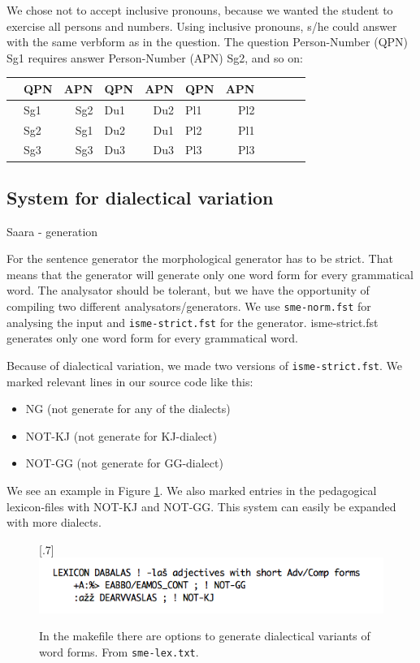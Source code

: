 \documentclass[a4paper,12pt]{article}
\begin{document}
We chose not to accept inclusive pronouns, because we wanted the student to exercise all persons and numbers. Using inclusive pronouns, s/he could answer with the same verbform as in the question. The question Person-Number (QPN) Sg1 requires answer Person-Number (APN) Sg2, and so on:\\


\begin{tabular}[t]{rlrlrlrlrlr}
&QPN &APN &QPN &APN &QPN &APN \\
\hline
&Sg1 &Sg2 &Du1 &Du2 &Pl1 &Pl2 \\
&Sg2 &Sg1 &Du2 &Du1 &Pl2 &Pl1 \\
&Sg3 &Sg3 &Du3 &Du3 &Pl3 &Pl3 \\
\end{tabular}


\subsection{System for dialectical variation}\label{dialect}
Saara - generation

For the sentence generator the morphological generator has to be strict. That means that the generator will generate only one word form for every grammatical word. The analysator should be tolerant, but we have the opportunity of compiling two different analysators/generators. We use \texttt{sme-norm.fst} for analysing the input and \texttt{isme-strict.fst} for the generator. isme-strict.fst generates only one word form for every grammatical word.

Because of dialectical variation, we made two versions of \texttt{isme-strict.fst}. We marked relevant lines in our source code like this:
\begin {itemize}
\item NG (not generate for any of the dialects)
\item NOT-KJ (not generate for KJ-dialect) 
\item NOT-GG (not generate for GG-dialect)  
\end {itemize}

We see an example in Figure \ref{smelex}. We also marked entries in the pedagogical lexicon-files with NOT-KJ and NOT-GG. This system can easily be expanded with more dialects.


\begin{figure}[htbp]
\begin{center}
\scalebox{.7}[.7]{\includegraphics{img/smelex.png}}\\
\caption{In the makefile there are options to generate dialectical variants of word forms. From \texttt{sme-lex.txt}.}
\label{smelex}
\end{center}
\end{figure}
\end{document}
